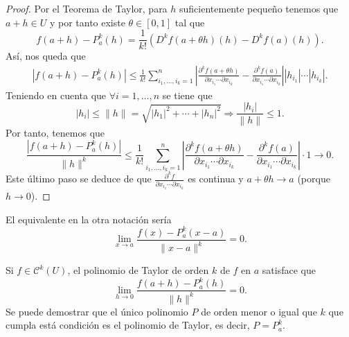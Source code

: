 \begin{proof}
	Por el Teorema de Taylor, para $\displaystyle h $ suficientemente pequeño tenemos que $\displaystyle a + h \in U $ y por tanto existe $\displaystyle \theta \in [0,1] $ tal que 
	\[f\left(a + h\right)-P^{k}_{a}\left(h\right) = \frac{1}{k!} \left( D^{k}f\left(a+\theta h\right)\left(h\right) - D^{k}f\left(a\right)\left(h\right)\right) .\]
Así, nos queda que 
\[
\begin{split}
\left|f\left(a+h\right)-P^{k}_{a}\left(h\right)\right| \leq \frac{1}{k!}\sum^{n}_{i_{1}, \ldots, i_{k} = 1} \left|\frac{\partial ^{k}f\left(a+\theta h\right)}{\partial x_{i_{1}} \cdots \partial x_{i_{k}}}-\frac{\partial ^{k}f\left(a\right)}{\partial x_{i_{1}} \cdots \partial x_{i_{k}}} \right| \left|h_{i_{1}}\right| \cdots \left|h_{i_{k}}\right| .
\end{split}
\]
Teniendo en cuenta que $\displaystyle \forall i = 1, \ldots, n $ se tiene que
\[ \left|h_{i}\right| \leq \|h\| = \sqrt{ \left|h_{1}\right|^{2} + \cdots + \left|h_{n}\right|^{2}} \Rightarrow \frac{ \left|h_{i}\right|}{\|h\|} \leq 1 .\]
Por tanto, tenemos que 
\[ \frac{ \left|f\left(a+h\right)-P^{k}_{a}\left(h\right)\right|}{\|h\|^{k}} \leq \frac{1}{k!} \sum^{n}_{i_{1}, \ldots, i_{k} = 1} \left|\frac{\partial ^{k}f\left(a+\theta h\right)}{\partial x_{i_{1}} \cdots \partial x_{i_{k}}}-\frac{\partial ^{k}f\left(a\right)}{\partial x_{i_{1}} \cdots \partial x_{i_{k}}}\right| \cdot 1 \to 0.\]
Este último paso se deduce de que $\displaystyle \frac{\partial^{k}f}{\partial x_{i_{1}} \cdots \partial x_{i_{k}}} $ es continua y $\displaystyle a+\theta h \to a $ (porque $\displaystyle h \to 0 $). 
\end{proof}
\begin{observation}
El equivalente en la otra notación sería
\[\lim_{x \to a}\frac{f\left(x\right)-P_{a}^{k}\left(x-a\right)}{\|x-a\|^{k}} = 0 .\]
\end{observation}
\begin{observation}
Si $\displaystyle f \in \mathcal{C}^{k}\left(U\right) $, el polinomio de Taylor de orden $\displaystyle k $ de $\displaystyle f $ en $\displaystyle a $ satisface que
\[\lim_{h \to 0}\frac{f\left(a+h\right)-P^{k}_{a}\left(h\right)}{\|h\|^{k}} = 0 .\]
Se puede demostrar que el único polinomio $\displaystyle P $ de orden menor o igual que $\displaystyle k $ que cumpla está condición es el polinomio de Taylor, es decir, $\displaystyle P = P_{a}^{k} $. 
\end{observation}
